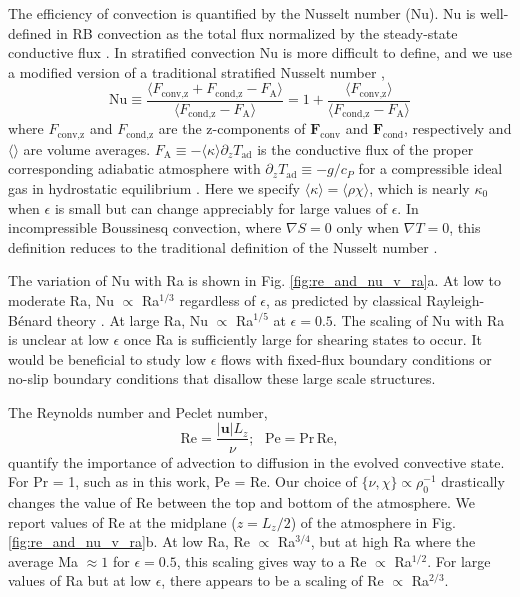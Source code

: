 \documentclass[aps, prl, twocolumn, nofootinbib, groupedaddress, amsfonts, amssymb, amsmath]{revtex4-1}
\newcommand{\grad}{\ensuremath{\nabla}}
\newcommand{\RB}{Rayleigh-B\'{e}nard }
\begin{document}
The efficiency of convection is quantified by the Nusselt number (Nu).  
Nu is well-defined in RB convection
as the total flux normalized by the steady-state conductive flux 
\cite{johnston&doering2009, otero&all2002}.
In stratified convection Nu is more difficult to define, and we use
a modified version of a traditional stratified Nusselt number 
\cite{graham1975,hurlburt&all1984},
\begin{equation}
\text{Nu} \equiv \frac{\langle F_{\text{conv,z}} + F_{\text{cond,z}} - F_{\text{A}}\rangle}
{\langle F_{\text{cond,z}} - F_{\text{A}}\rangle} 
= 1 + \frac{\langle F_{\text{conv,z}}\rangle}{\langle F_{\text{cond,z}} - F_{\text{A}} \rangle}
\label{eqn:nusselt}
\end{equation}
where $F_{\text{conv,z}}$ and $F_{\text{cond,z}}$ are the 
z-components of $\bm{F}_{\text{conv}}$ and $\bm{F}_{\text{cond}}$,
respectively and $\langle \rangle$ are volume averages.  
$F_{\text{A}} \equiv -\langle\kappa\rangle \partial_z T_{\text{ad}}$ 
is the conductive flux of the proper corresponding adiabatic atmosphere
with $\partial_z T_{\text{ad}} \equiv - g / c_{P}$ 
for a compressible ideal gas in hydrostatic equilibrium \cite{spiegel&veronis1960}.  Here we specify
$\langle \kappa \rangle = \langle \rho\chi \rangle$, which is nearly
$\kappa_0$ when $\epsilon$ is small but can change appreciably for large
values of $\epsilon$.
In incompressible Boussinesq convection, where $\grad S = 0$ only when 
$\grad T = 0$, this definition reduces to the traditional definition
of the Nusselt number \cite{otero&all2002, johnston&doering2009}.

The variation of Nu with Ra is shown in 
Fig. \ref{fig:re_and_nu_v_ra}a.
At low to moderate Ra, 
Nu $\propto$ Ra$^{1/3}$ regardless of $\epsilon$,
as predicted by classical \RB theory \cite{king&all2012}.
At large Ra, Nu $\propto$ Ra$^{1/5}$ 
at $\epsilon = 0.5$.
The scaling of Nu with Ra 
is unclear at low $\epsilon$ once Ra is sufficiently large
for shearing states to occur.  It would be beneficial to study
low $\epsilon$ flows with fixed-flux boundary conditions or
no-slip boundary conditions that disallow these large scale
structures.

The Reynolds number and Peclet number,
\begin{equation}
\text{Re} = \frac{|\bm{u}| L_z}{\nu};\,\,\,\,\text{Pe} = \text{Pr}\,\text{Re},
\end{equation}
quantify the importance of advection to diffusion in the evolved
convective state.  For Pr = 1, such as in this work, Pe = Re.  
Our choice of $\{\nu,\chi\}\propto \rho_0^{-1}$ drastically changes
the value of Re between the top and bottom of the atmosphere.  We report values of
Re at the midplane ($z=L_z/2$) of the atmosphere in
Fig. \ref{fig:re_and_nu_v_ra}b.
At low Ra, Re $\propto$ Ra$^{3/4}$, but at high 
Ra where the average Ma $\approx 1$ for $\epsilon = 0.5$, 
this scaling gives way to a Re $\propto$ Ra$^{1/2}$.
For large values of Ra but at low $\epsilon$, there appears to be a scaling
of Re $\propto$ Ra$^{2/3}$.
\end{document}
